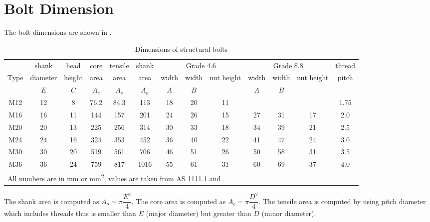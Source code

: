 \section{Bolt Dimension}
The bolt dimensions are shown in .
\begin{table}[H]
\setlength{\tabcolsep}{0.2em}
\centering\footnotesize\caption{Dimensions of structural bolts}\label{tab:bolt_dim}
\begin{tabular}{c|cc|ccc|ccc|ccc|c}
    \toprule
         &  shank   &  head  & core  & tensile & shank & \multicolumn{3}{c|}{Grade 4.6} & \multicolumn{3}{c|}{Grade 8.8} & thread \\
    Type & diameter & height & area  &  area   & area  & width & width &   nut height   & width & width &   nut height   & pitch  \\
         &   $E$    &  $C$   & $A_c$ &  $A_s$  & $A_o$ &  $A$  &  $B$  &                &  $A$  &  $B$  &                &        \\ \midrule
    M12  &    12    &   8    & 76.2  &  84.3   &  113  &  18   &  20   &       11       &       &       &                &  1.75  \\
    M16  &    16    &   11   &  144  &   157   &  201  &  24   &  26   &       15       &  27   &  31   &       17       &  2.0   \\
    M20  &    20    &   13   &  225  &   256   &  314  &  30   &  33   &       18       &  34   &  39   &       21       &  2.5   \\
    M24  &    24    &   16   &  324  &   353   &  452  &  36   &  40   &       22       &  41   &  47   &       24       &  3.0   \\
    M30  &    30    &   20   &  519  &   561   &  706  &  46   &  51   &       26       &  50   &  58   &       31       &  3.5   \\
    M36  &    36    &   24   &  759  &   817   & 1016  &  55   &  61   &       31       &  60   &  69   &       37       &  4.0   \\ \bottomrule
    \multicolumn{13}{l}{All numbers are in \si{\mm} or \si{\mm^2}, values are taken from AS 1111.1 and \ASNZSFASTERNER{~}.}
\end{tabular}
\end{table}
The shank area is computed as $A_o=\pi\dfrac{E^2}{4}$. The core area is computed as $A_c=\pi\dfrac{D^2}{4}$. The tensile area is computed by using pitch diameter which includes threads thus is smaller than $E$ (major diameter) but greater than $D$ (minor diameter).
